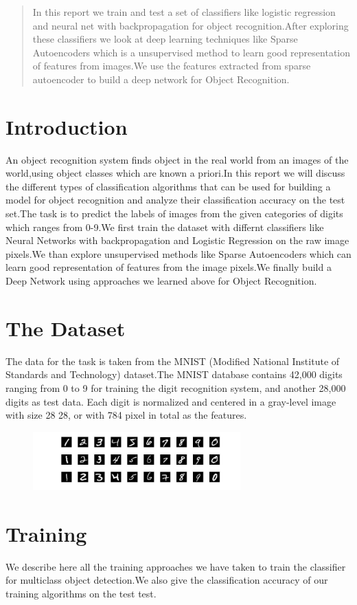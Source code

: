 \documentclass[18pt,letterpaper]{article}
\begin{document}
\begin{abstract}
In this report we train and test a set of classifiers like logistic regression and neural net with backpropagation for object recognition.After exploring these classifiers we look at deep learning techniques like Sparse Autoencoders which is a unsupervised method to learn good representation of features from images.We use the features extracted from sparse autoencoder to build a deep network for Object Recognition.
\end{abstract}
\section{Introduction}
An object recognition system finds object in the real world from an images of the world,using object classes which are known a priori.In this report we will discuss the different types of classification algorithms that can be used for building a model for object recognition and analyze their classification accuracy on the test set.The task is to predict the labels of images from the given categories of digits which ranges from 0-9.We first train the dataset with differnt classifiers like Neural Networks with backpropagation and Logistic Regression on the raw image pixels.We than explore unsupervised methods like Sparse Autoencoders which can learn good representation of features from the image pixels.We finally build a Deep Network using approaches we learned above for Object Recognition.
\section{The Dataset}
The data for the task is taken from the MNIST (Modified National Institute of Standards and Technology) dataset.The MNIST database contains 42,000 digits ranging from 0 to 9 for training the digit recognition system, and another 28,000 digits as test data. Each digit is normalized and centered in a gray-level image with size 28 28, or with 784 pixel in total as the features. 
\begin{figure}[ht!]
\includegraphics[width=8cm]{pic.jpg}
\end{figure}
\section{Training}
We describe here all the training approaches we have taken to train the classifier for multiclass object detection.We also give the classification accuracy of our training algorithms on the test test.
\end{document}

